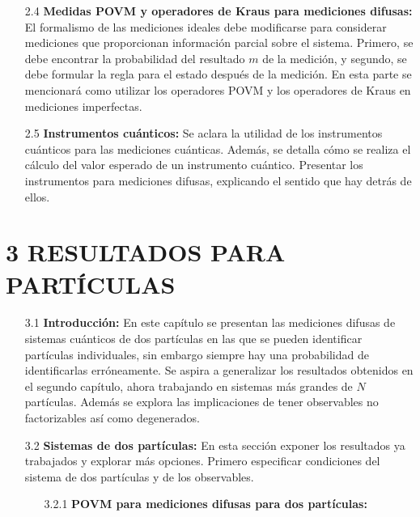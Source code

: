 \documentclass[12pt,oneside]{book}\raggedbottom{} %
\begin{document}
\begin{sloppypar}
{{\begin{itemize}
\begin{itemize}
\end{itemize}




  \item[2.4]\textbf{Medidas POVM y operadores de Kraus para mediciones difusas:}
  { El formalismo de las mediciones ideales debe modificarse para considerar mediciones que proporcionan información parcial sobre el sistema. Primero, se debe encontrar la probabilidad del resultado $m$ de la medición, y segundo, se debe formular la regla para el estado después de la medición.}
  {En esta parte se mencionará como utilizar los operadores POVM y los operadores de Kraus en mediciones imperfectas.}

  
  
  \item[2.5]  \textbf{Instrumentos cuánticos:} Se aclara la utilidad de los instrumentos cuánticos para las mediciones cuánticas. Además, se detalla cómo se realiza el cálculo del valor esperado de un instrumento cuántico. {Presentar los instrumentos para mediciones difusas, explicando el sentido que hay detrás de ellos.}
\end{itemize}


\section*{3 RESULTADOS PARA \texorpdfstring{}{N}  PARTÍCULAS}
\begin{itemize}

  \item[3.1] \textbf{Introducción:}   En este capítulo se presentan las mediciones difusas de sistemas cuánticos de dos partículas en las que se pueden identificar partículas individuales, sin embargo siempre hay una probabilidad de identificarlas erróneamente. Se aspira a generalizar los resultados obtenidos en el segundo capítulo, ahora trabajando en sistemas más grandes de $N$ partículas.  Además se explora las implicaciones de tener observables no factorizables así como degenerados.
  
  \item[3.2]  \textbf{Sistemas de dos partículas:}
  En esta sección exponer los resultados ya trabajados y explorar más opciones. Primero especificar condiciones del sistema de dos partículas y de los observables.

  \begin{itemize}
    \item[3.2.1] \textbf{POVM para mediciones difusas para dos partículas:}\label{Sec_POVM_para_mediciones_difusas} %
    

\end{itemize}
\end{itemize}}}
\end{sloppypar}
\end{document}
